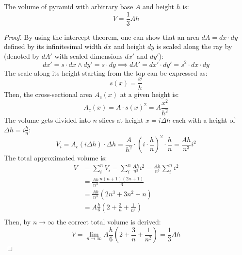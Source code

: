 \begin{theorem}
    The volume of pyramid with arbitrary base $A$ and height $h$ is:
    \begin{equation}
        V = \frac{1}{3}Ah
    \end{equation}
\end{theorem}
\begin{proof}
    By using the intercept theorem, one can show that an area $dA=dx \cdot dy$ defined 
    by its infinitesimal width $dx$ and height $dy$ is scaled along the ray by 
    (denoted by $dA'$ with scaled dimensions $dx'$ and $dy'$):
    \begin{equation}
        dx' = s \cdot dx \land dy' = s \cdot dy \implies dA' = dx' \cdot dy' = s^2 \cdot dx \cdot dy
    \end{equation}
    The scale along its height starting from the top can be expressed as:
    \begin{equation}
        s(x) = \frac{x}{h}
    \end{equation}
    Then, the cross-sectional area $A_c(x)$ at a given height is:
    \begin{equation}
        A_c(x) = A \cdot s(x)^2 = A \frac{x^2}{h^2}
    \end{equation}
    The volume gets divided into $n$ slices at height $x = i \Delta h$ 
    each with a height of $\Delta h=i\frac{h}{n}$:
    \begin{equation}
        V_i = A_c(i \Delta h) \cdot \Delta h 
            = \frac{A}{h^2} \cdot \left(i \cdot \frac{h}{n}\right)^2 \cdot \frac{h}{n} 
            = \frac{A h}{n^3} i^2
    \end{equation}
    The total approximated volume is:
    \begin{equation}
        \begin{split}
            V & = \sum_{i}^{n}V_i 
                = \sum_{i}^{n}\frac{A h}{n^3} i^2
                =  \frac{A h}{n^3} \sum_{i}^{n}i^2 \\
              & =  \frac{A h}{n^3} \frac{n(n+1)(2n+1)}{6} \\
              & =  \frac{A h}{n^3} (2n^3+3n^2+n) \\
              & =  A\frac{h}{6} (2+\frac{3}{n}+\frac{1}{n^2}) \\
        \end{split}
    \end{equation}
    Then, by $n \rightarrow \infty$ the correct total volume is derived:
    \begin{equation}
        V = \lim_{n \rightarrow \infty}A\frac{h}{6} (2+\frac{3}{n}+\frac{1}{n^2}) = \frac{1}{3}Ah
    \end{equation}
\end{proof}

